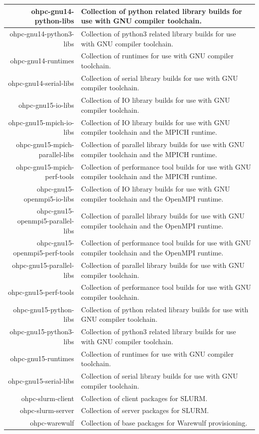 \begin{tabularx}{\textwidth}{r|X}
\hline
ohpc-gnu14-python-libs & Collection of python related library builds for use with GNU compiler toolchain. \\
\hline
ohpc-gnu14-python3-libs & Collection of python3 related library builds for use with GNU compiler toolchain. \\
\hline
ohpc-gnu14-runtimes & Collection of runtimes for use with GNU compiler toolchain. \\
\hline
ohpc-gnu14-serial-libs & Collection of serial library builds for use with GNU compiler toolchain. \\
\hline
ohpc-gnu15-io-libs & Collection of IO library builds for use with GNU compiler toolchain. \\
\hline
ohpc-gnu15-mpich-io-libs & Collection of IO library builds for use with GNU compiler toolchain and the MPICH runtime. \\
\hline
ohpc-gnu15-mpich-parallel-libs & Collection of parallel library builds for use with GNU compiler toolchain and the MPICH runtime. \\
\hline
ohpc-gnu15-mpich-perf-tools & Collection of performance tool builds for use with GNU compiler toolchain and the MPICH runtime. \\
\hline
ohpc-gnu15-openmpi5-io-libs & Collection of IO library builds for use with GNU compiler toolchain and the OpenMPI runtime. \\
\hline
ohpc-gnu15-openmpi5-parallel-libs & Collection of parallel library builds for use with GNU compiler toolchain and the OpenMPI runtime. \\
\hline
ohpc-gnu15-openmpi5-perf-tools & Collection of performance tool builds for use with GNU compiler toolchain and the OpenMPI runtime. \\
\hline
ohpc-gnu15-parallel-libs & Collection of parallel library builds for use with GNU compiler toolchain. \\
\hline
ohpc-gnu15-perf-tools & Collection of performance tool builds for use with GNU compiler toolchain. \\
\hline
ohpc-gnu15-python-libs & Collection of python related library builds for use with GNU compiler toolchain. \\
\hline
ohpc-gnu15-python3-libs & Collection of python3 related library builds for use with GNU compiler toolchain. \\
\hline
ohpc-gnu15-runtimes & Collection of runtimes for use with GNU compiler toolchain. \\
\hline
ohpc-gnu15-serial-libs & Collection of serial library builds for use with GNU compiler toolchain. \\
\hline
ohpc-slurm-client & Collection of client packages for SLURM. \\
\hline
ohpc-slurm-server & Collection of server packages for SLURM. \\
\hline
ohpc-warewulf & Collection of base packages for Warewulf provisioning. \\
\hline
\bottomrule
\end{tabularx}
